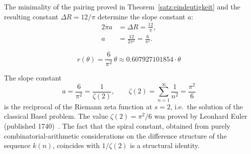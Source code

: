 The minimality of the pairing proved in Theorem~\ref{satz:eindeutigkeit}
and the resulting constant $\Delta R = 12/\pi$ determine
the slope constant $a$:
\begin{align}
  2\pi a &= \Delta R = \frac{12}{\pi},\\[4pt]
  a &= \frac{12}{2\pi^2} = \frac{6}{\pi^2}.
\end{align}

\begin{theorem}
\begin{equation}
  \boxed{
    r(\theta) = \frac{6}{\pi^2}\,\theta
    \approx 0.607927101854 \cdot \theta
  }
\end{equation}
\end{theorem}

\begin{remark}
The slope constant
\[
  a = \frac{6}{\pi^2} = \frac{1}{\zeta(2)},
  \qquad
  \zeta(2) = \sum_{n=1}^{\infty} \frac{1}{n^2} = \frac{\pi^2}{6}
\]
is the reciprocal of the Riemann zeta function at $s=2$, i.e.\ the
solution of the classical Basel problem. The value $\zeta(2) = \pi^2/6$
was proved by Leonhard Euler (published 1740)~\cite{Euler1740,Hardy2008}. The fact
that the spiral constant, obtained from purely combinatorial-arithmetic
considerations on the difference structure of the sequence $k(n)$,
coincides with $1/\zeta(2)$ is a structural identity.
\end{remark}

